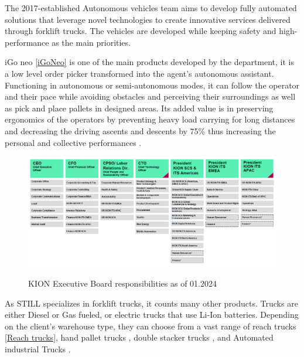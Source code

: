 The 2017-established Autonomous vehicles team aims to develop fully automated solutions that leverage 
novel technologies to create innovative services delivered through forklift trucks. 
The vehicles are developed while keeping safety and high-performance as the main priorities.  

iGo neo \ref{iGoNeo} is one of the main products developed by the department, it is a low level order picker transformed 
into the agent's autonomous assistant. Functioning in autonomous or semi-autonomous modes, it can follow 
the operator and their pace while avoiding obstacles and perceiving their surroundings as well as pick 
and place pallets in designed areas. Its added value is in preserving ergonomics of the operators by 
preventing heavy load carrying for long distances and decreasing the driving ascents and descents by 75\% 
thus increasing the personal and collective performances \cite{R3}.

\begin{figure}[H]
    \begin{center}
    \includegraphics[width=7in]{images/Chap0/KION_Hierarchy.png}\\
    \caption{KION Executive Board responsibilities as of 01.2024 \cite{R2}}
    \label{KION Hierarchy}
    \end{center}
    \end{figure}

As STILL specializes in forklift trucks, it counts many other products. Trucks are either Diesel or 
Gas fueled, or electric trucks that use Li-Ion batteries. Depending on the client's warehouse type, they can
choose from a vast range of reach trucks \ref{Reach trucks}, hand pallet trucks , 
double stacker trucks , and Automated industrial Trucks  \cite{R4}.



